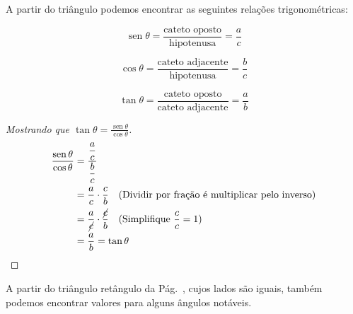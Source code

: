 \documentclass[12pt,openright,twoside,a4paper]{article}
\theoremstyle{definition}
\renewcommand{\sin}{\operatorname{sen}} %
\begin{document}
	A partir do triângulo podemos encontrar as seguintes relações trigonométricas:
	
	\begin{equation}
		\sin{\theta} = \frac{\text{cateto oposto}}{\text{hipotenusa}} = \frac{a}{c}
	\end{equation}
	
	\begin{equation}
		\cos{\theta} = \frac{\text{cateto adjacente}}{\text{hipotenusa}} = \frac{b}{c}
	\end{equation}
	
	\begin{equation}
		\tan{\theta} = \frac{\text{cateto oposto}}{\text{cateto adjacente}} = \frac{a}{b}
	\end{equation}
	
	\begin{proof}[Mostrando que $\tan{\theta} = \displaystyle \frac{\sin{\theta}}{\cos{\theta}}$]
		
		\begin{align*}
			\frac{\sin{\theta}}{\cos{\theta}} &= \displaystyle \frac{\displaystyle \frac{a}{c}}{\displaystyle \frac{b}{c}}\\
			&= \displaystyle \frac{a}{c} \cdot \frac{c}{b} \quad \text{(Dividir por fração é multiplicar pelo inverso)}\\
			&= \displaystyle \frac{a}{{\cancel{c}}} \cdot \frac{{\cancel{c}}}{b} \quad \text{(Simplifique $\frac{c}{c} = 1$)}\\
			&= \frac{a}{b} = \tan{\theta} \qedhere
		\end{align*}
	\end{proof}
	
	A partir do triângulo retângulo da Pág.~\pageref{fig:triangulo_retangulo}, cujos lados são iguais, também podemos encontrar valores para alguns ângulos notáveis.
	
\end{document}
